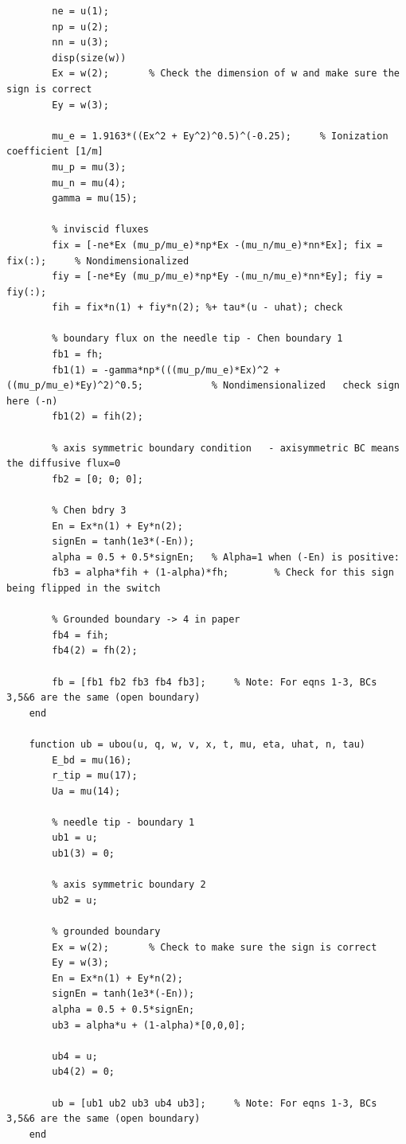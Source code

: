 \documentclass[12pt, a4paper]{report}
\begin{document}
\begin{lstlisting}
        ne = u(1);
        np = u(2);
        nn = u(3);
        disp(size(w))
        Ex = w(2);       % Check the dimension of w and make sure the sign is correct
        Ey = w(3);
        
        mu_e = 1.9163*((Ex^2 + Ey^2)^0.5)^(-0.25);     % Ionization coefficient [1/m]
        mu_p = mu(3);
        mu_n = mu(4);
        gamma = mu(15);
        
        % inviscid fluxes
        fix = [-ne*Ex (mu_p/mu_e)*np*Ex -(mu_n/mu_e)*nn*Ex]; fix = fix(:);     % Nondimensionalized
        fiy = [-ne*Ey (mu_p/mu_e)*np*Ey -(mu_n/mu_e)*nn*Ey]; fiy = fiy(:);
        fih = fix*n(1) + fiy*n(2); %+ tau*(u - uhat); check
        
        % boundary flux on the needle tip - Chen boundary 1
        fb1 = fh;
        fb1(1) = -gamma*np*(((mu_p/mu_e)*Ex)^2 + ((mu_p/mu_e)*Ey)^2)^0.5;            % Nondimensionalized   check sign here (-n)
        fb1(2) = fih(2);
    
        % axis symmetric boundary condition   - axisymmetric BC means the diffusive flux=0
        fb2 = [0; 0; 0]; 
        
        % Chen bdry 3
        En = Ex*n(1) + Ey*n(2);
        signEn = tanh(1e3*(-En));    
        alpha = 0.5 + 0.5*signEn;   % Alpha=1 when (-En) is positive: 
        fb3 = alpha*fih + (1-alpha)*fh;        % Check for this sign being flipped in the switch
        
        % Grounded boundary -> 4 in paper
        fb4 = fih;
        fb4(2) = fh(2);
            
        fb = [fb1 fb2 fb3 fb4 fb3];     % Note: For eqns 1-3, BCs 3,5&6 are the same (open boundary)
    end
    
    function ub = ubou(u, q, w, v, x, t, mu, eta, uhat, n, tau)
        E_bd = mu(16);
        r_tip = mu(17);
        Ua = mu(14);
    
        % needle tip - boundary 1
        ub1 = u;
        ub1(3) = 0;
        
        % axis symmetric boundary 2
        ub2 = u;
        
        % grounded boundary
        Ex = w(2);       % Check to make sure the sign is correct
        Ey = w(3);
        En = Ex*n(1) + Ey*n(2);
        signEn = tanh(1e3*(-En));    
        alpha = 0.5 + 0.5*signEn;
        ub3 = alpha*u + (1-alpha)*[0,0,0];
       
        ub4 = u;
        ub4(2) = 0;    
            
        ub = [ub1 ub2 ub3 ub4 ub3];     % Note: For eqns 1-3, BCs 3,5&6 are the same (open boundary)
    end
    

\end{lstlisting}
\end{document}
